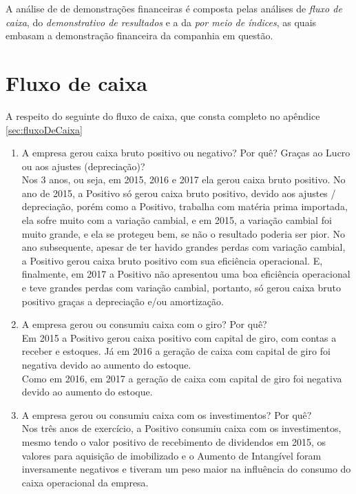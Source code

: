 A análise de de demonstrações financeiras é composta pelas análises de \emph{fluxo de caixa}, do \emph{demonstrativo de resultados} e a da \emph{por meio de índices}, as quais embasam a demonstração financeira da companhia em questão.

\section{Fluxo de caixa}

A respeito do seguinte do fluxo de caixa, que consta completo no apêndice \ref{sec:fluxoDeCaixa}

\begin{enumerate}
\item  A empresa gerou caixa bruto positivo ou negativo? Por quê? Graças ao Lucro ou aos ajustes (depreciação)?\\ Nos 3 anos, ou seja, em 2015, 2016 e 2017 ela gerou caixa bruto positivo. No ano de 2015, a Positivo só gerou caixa bruto positivo, devido aos ajustes / depreciação, porém como a Positivo, trabalha com matéria prima importada, ela sofre muito com a variação cambial, e em 2015, a variação cambial foi muito grande, e ela se protegeu bem, se não o resultado poderia ser pior. No ano subsequente, apesar de ter havido grandes perdas com variação cambial, a Positivo gerou caixa bruto positivo com sua eficiência operacional. E, finalmente, em 2017 a Positivo não apresentou uma boa eficiência operacional e teve grandes perdas com variação cambial, portanto, só gerou caixa bruto positivo graças a depreciação e/ou amortização.

\item A empresa gerou ou consumiu caixa com o giro? Por quê? \\ Em 2015 a Positivo gerou caixa positivo com capital de giro, com contas a receber e estoques. Já em 2016 a geração de caixa com capital de giro foi negativa devido ao aumento do estoque. \\ Como em 2016, em 2017 a geração de caixa com capital de giro foi negativa devido ao aumento do estoque.

\item A empresa gerou ou consumiu caixa com os investimentos? Por quê? \\ Nos três anos de exercício, a Positivo consumiu caixa com os investimentos, mesmo tendo o valor positivo de recebimento de dividendos em 2015, os valores para aquisição de imobilizado e o Aumento de Intangível foram inversamente negativos e tiveram um peso maior na influência do consumo do caixa operacional da empresa.


\end{enumerate}
